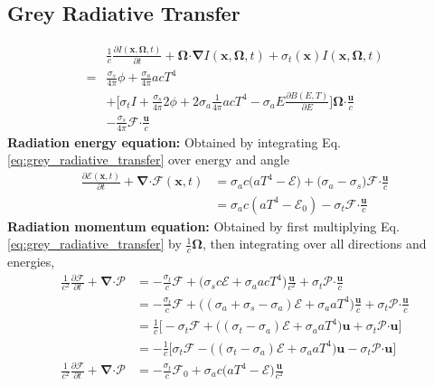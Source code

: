 \documentclass[10pt,letterpaper,notitlepage]{article}
\numberwithin{equation}{section}
\newcommand{\partialderiv}[2]{\frac{\partial #1}{\partial #2}}
\newcommand{\Omegabf}{\mathbf{\Omega}}
\newcommand{\bnabla}{\boldsymbol{\nabla}}
\newcommand{\position}{\mathbf{x}}
\newcommand{\velocity}{\mathbf{u}}
\newcommand{\dotp}{\boldsymbol{\cdot}}
\newcommand{\RadE}{\mathcal{E}}
\newcommand{\RadF}{\boldsymbol{\mathcal{F}}}
\newcommand{\RadP}{\boldsymbol{\mathcal{P}}}
\newcommand{\beqn}{\begin{equation}\begin{aligned}}
\newcommand{\eeqn}{\end{aligned}\end{equation}}
\begin{document}
\subsection{Grey Radiative Transfer}
\beqn \label{eq:grey_radiative_transfer}
&\frac{1}{c} \frac{\partial I(\position, \Omegabf, t)}{\partial t} 
+\Omegabf \dotp \bnabla I(\position, \Omegabf, t)
+\sigma_t(\position) I(\position, \Omegabf, t) \\
=& \frac{\sigma_s}{4\pi} \phi
+ \frac{\sigma_a}{4\pi} a c T^4\\
&+
\biggr[
\sigma_t  I
+\frac{\sigma_s}{4\pi} 2\phi 
+2\sigma_a \frac{1}{4\pi} acT^4
-\sigma_a E \frac{\partial B(E,T)}{\partial E}
\biggr] \Omegabf \dotp \frac{\mathbf{u}}{c} \\
&-\frac{\sigma_s}{4\pi}  \RadF \dotp \frac{\mathbf{u}}{c}
\eeqn 
\textbf{Radiation energy equation:}\newline 
Obtained by integrating Eq. \eqref{eq:grey_radiative_transfer} over energy and angle
\beqn \label{eq:radiation_energy_equation}
\frac{\partial \RadE(\position, t)}{\partial t} 
+\bnabla \dotp \RadF(\position, t) &=  \sigma_a c \bigr( aT^4 - \RadE \bigr)
+ \bigr( \sigma_a  - \sigma_s\bigr)
\RadF \dotp  \frac{\mathbf{u}}{c} \\
&= \sigma_a c(aT^4 - \RadE_0) - \sigma_t \RadF \dotp \frac{\velocity}{c} 
\eeqn 
\newline
\newline 
\textbf{Radiation momentum equation:}\newline
Obtained by first multiplying Eq. \eqref{eq:grey_radiative_transfer} by $\frac{1}{c} \Omegabf$, then integrating over all directions and energies,
\beqn \label{eq:radiation_momentum_equation}
\frac{1}{c^2} \partialderiv{\RadF}{t} + \bnabla \dotp \RadP &= - \frac{\sigma_t}{c} \RadF  
+ \bigr( \sigma_s c\RadE + \sigma_a acT^4 \bigr) \frac{\mathbf{u}}{c^2} 
+\sigma_t \RadP \dotp \frac{\mathbf{u}}{c} \\
&=  - \frac{\sigma_t}{c} \RadF + \bigr((\sigma_a +\sigma_s -\sigma_a)\RadE + \sigma_a a  T^4\bigr)\frac{\velocity}{c} + \sigma_t \RadP \dotp \frac{\mathbf{u}}{c} \\
&= \frac{1}{c}\biggr[  
- \sigma_t \RadF + \bigr((\sigma_t -\sigma_a)\RadE + \sigma_a a  T^4\bigr)\velocity + \sigma_t \RadP \dotp \velocity 
\biggr]\\
&= -\frac{1}{c}\biggr[  
 \sigma_t \RadF - \bigr((\sigma_t -\sigma_a)\RadE + \sigma_a a  T^4\bigr)\velocity -\sigma_t \RadP \dotp \velocity 
\biggr]\\
\frac{1}{c^2} \partialderiv{\RadF}{t} + \bnabla \dotp \RadP &= -\frac{\sigma_t}{c}
\RadF_0 +  \sigma_a c\bigr(a  T^4 - \RadE \bigr)\frac{\velocity  }{c^2}
\eeqn 
\end{document}

